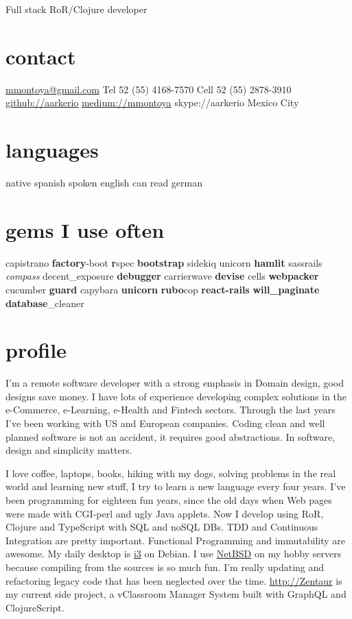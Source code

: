 \documentclass[]{k-cv}
\begin{document}
       {Full stack RoR/Clojure developer}

\begin{aside}
  \section{contact}
    \href{mailto:mmontoya@gmail.com}{mmontoya@gmail.com}
    Tel  52 (55) 4168-7570
    Cell 52 (55) 2878-3910
    \href{http://github.com/aarkerio}{github://aarkerio}
    \href{https://medium.com/@mmontoya}{medium://mmontoya}
    skype://aarkerio
    Mexico City
  \section{languages}
    native spanish
	  spoken english
	  can read german

  \section{gems I use often}
    capistrano \textbf{factory}-boot \textbf{r}spec
    \textbf{bootstrap} sidekiq unicorn \textbf{hamlit} sassrails \textit{compass}
    decent\_exposure \textbf{debugger} carrierwave \textbf{devise} cells \textbf{webpacker}
    cucumber \textbf{guard} capybara \textbf{unicorn}
    \textbf{rubo}cop \textbf{react-rails}
    \textbf{will\_paginate} \textbf{database}\_cleaner

\end{aside}

\section{profile}

I'm a remote software developer with a strong emphasis in Domain design, good designs save money. I have lots of experience developing complex solutions in the e-Commerce,
e-Learning, e-Health and Fintech sectors. Through the last years I've been working with US and European companies. Coding clean and well planned software is not an accident,
it requires good abstractions. In software, design and simplicity matters.

I love coffee, laptops, books, hiking with my dogs, solving problems in the real world and learning new stuff, I try to learn a new language every four years. I've been
programming for eighteen fun years, since the old days when Web pages were made with CGI-perl and ugly Java applets. Now I develop using RoR, Clojure and TypeScript with SQL and
noSQL DBs. TDD and Continuous Integration are pretty important. Functional Programming and immutability are awesome. My daily desktop is \href{https://i3wm.org/}{i3} on Debian. I use \href{http://netbsd.org}{NetBSD} on my hobby servers because compiling from the sources is so much fun. I'm really updating and refactoring legacy code that has been neglected over the time. \href{https://github.com/aarkerio/ZentaurLMS/blob/master/src/cljs/zentaur/reframe/tests/events.cljs}{http://Zentaur}
is my current side project, a vClassroom Manager System built with GraphQL and ClojureScript.
\end{document}
